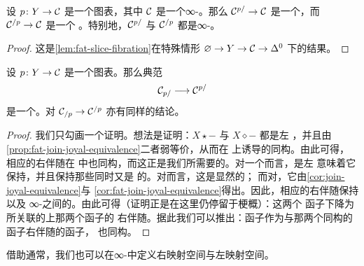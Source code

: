 \begin{corollary}\label{cor:fat-slice-infinity-category}
设 $p\colon Y \to \mathcal{C}$ 是一个图表，其中 $\mathcal{C}$ 是一个∞-\trCategory{}。那么\trFunctor{}%
$\mathcal{C}^{p/} \to \mathcal{C}$ 是一个\trLeftFibration{}，而\trFunctor{} $\mathcal{C}^{/p} \to \mathcal{C}$ 是一个%
\trRightFibration{}。特别地，$\mathcal{C}^{p/}$ 与 $\mathcal{C}^{/p}$ 都是∞-\trCategories{}。
\end{corollary}

\begin{proof}
这是\cref{lem:fat-slice-fibration}在特殊情形
$\varnothing \to Y \to \mathcal{C} \to \Delta^0$ 下的结果。
\end{proof}

\begin{proposition}\label{prop:slice-fat-slice-joyal-equivalence}
设 $p\colon Y \to \mathcal{C}$ 是一个图表。那么典范\trFunctor{}%
\[
\mathcal{C}_{p/} \longrightarrow \mathcal{C}^{p/}
\]
是一个\trJoyalEquivalence{}。对 $\mathcal{C}_{/p} \to \mathcal{C}^{/p}$ 亦有同样的结论。
\end{proposition}

\begin{proof}
我们只勾画一个证明。想法是证明：$X \star -$ 与 $X \diamond -$ 都是左\trQuillen{}%
\trFunctor{}，并且由\cref{prop:fat-join-joyal-equivalence}二者弱等价，从而在%
\trHomotopyCategory{}上诱导的\trFunctor{}同构。由此可得，相应的右伴随在%
\trHomotopyCategory{}中也同构，而这正是我们所需要的。对一个\trFunctor{}而言，是左%
\trQuillen{}\trFunctor{}意味着它保持\trMonomorphism{}，并且保持那些同时又是%
\trJoyalEquivalence{}的\trMonomorphism{}。对\trMonomorphism{}而言，这是显然的；
而对\trJoyalEquivalence{}，它由\cref{cor:join-joyal-equivalence}与%
\cref{cor:fat-join-joyal-equivalence}得出。因此，相应的右伴随保持\trTrivialFibration{}以及
∞-\trCategories{}之间的\trFibration{}。由此可得（证明正是在这里仍停留于梗概）：这两个\trSlice{}%
函子下降为\trJoyal{}\trModelStructure{}所关联的\trHomotopyCategory{}上那两个\trJoin{}函子的
右伴随。据此我们可以推出：\trSlice{}函子作为与那两个同构的\trJoin{}函子右伴随的函子，
也同构。
\end{proof}

借助通常\trSlice{}，我们也可以在∞-\trCategory{}中定义右映射空间与左映射空间。


